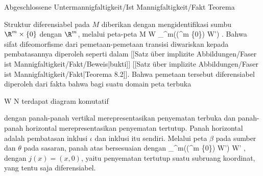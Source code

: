 {Abgeschlossene Untermannigfaltigkeit/Ist Mannigfaltigkeit/Fakt}
{Teorema}
{}
{

\faktzusatz {}
\faktzusatz {}

}
{

Struktur diferensiabel pada $M$ diberikan dengan mengidentifikasi sumbu
$\R^m\times\{0\}$ dengan $\R^m$, melalui peta-peta
 {M \cap W} {_{\R^m}\bigl((\R^m \times \{0\}) \cap W'\bigr)
} {}
.
Bahwa sifat difeomorfisme dari pemetaan-pemetaan transisi diwariskan kepada pembatasannya diperoleh seperti dalam [[Satz über implizite Abbildungen/Faser ist Mannigfaltigkeit/Fakt/Beweis|bukti]]
[[Satz über implizite Abbildungen/Faser ist Mannigfaltigkeit/Fakt|Teorema 8.2]].
Bahwa pemetaan tersebut diferensiabel diperoleh dari fakta bahwa bagi suatu domain peta terbuka

\mavergleichskette
{\vergleichskette
{ W
}
{ \subseteq }{ N
}
{  }{
}
{    }{
}
{   }{
}
}
{}{}{}
terdapat diagram komutatif

 {  }

dengan panah-panah vertikal merepresentasikan penyematan terbuka dan panah-panah horizontal merepresentasikan penyematan tertutup. Panah horizontal adalah pembatasan inklusi $\iota$ dan inklusi itu sendiri. Melalui peta $\beta$ pada sumber dan $\theta$ pada sasaran, panah atas bersesuaian dengan
 {_{\R^m}\bigl((\R^m \times \{0\}) \cap W'\bigr)} {W'
} {,}
dengan $j(x)=(x,0)$, yaitu penyematan tertutup suatu subruang koordinat, yang tentu saja diferensiabel.

}

